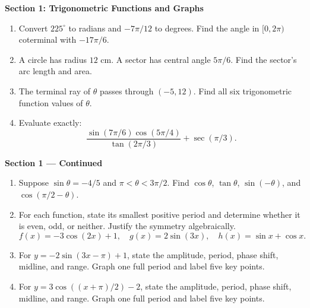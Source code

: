 \documentclass[11pt]{article}
\begin{document}
\newpage
\begin{center}{\large\textbf{Section 1: Trigonometric Functions and Graphs}}\end{center}
\begin{enumerate}[leftmargin=*,itemsep=0pt,series=chapterSix]
  \item Convert $225^\circ$ to radians and $-7\pi/12$ to degrees.
  Find the angle in $[0,2\pi)$ coterminal with $-17\pi/6$.
  \par{}

  \item A circle has radius $12$ cm. A sector has central angle $5\pi/6$.
  Find the sector's arc length and area.
  \par{}

  \item The terminal ray of $\theta$ passes through $(-5,12)$.
  Find all six trigonometric function values of $\theta$.
  \par{}

  \item Evaluate exactly:
  \[
    \frac{\sin(7\pi/6)\cos(5\pi/4)}{\tan(2\pi/3)}+\sec(\pi/3).
  \]
  \par{}
\end{enumerate}

\newpage
\begin{center}{\large\textbf{Section 1 --- Continued}}\end{center}
\begin{enumerate}[leftmargin=*,itemsep=0pt,resume=chapterSix]
  \item Suppose $\sin\theta=-4/5$ and $\pi<\theta<3\pi/2$.
  Find $\cos\theta$, $\tan\theta$, $\sin(-\theta)$, and
  $\cos(\pi/2-\theta)$.
  \par{}

  \item For each function, state its smallest positive period and determine
  whether it is even, odd, or neither. Justify the symmetry algebraically.
  \[
    f(x)=-3\cos(2x)+1,\quad g(x)=2\sin(3x),\quad h(x)=\sin x+\cos x.
  \]
  \par{}

  \item For $y=-2\sin(3x-\pi)+1$, state the amplitude, period, phase shift,
  midline, and range. Graph one full period and label five key points.
  \par{}

  \item For $y=3\cos((x+\pi)/2)-2$, state the amplitude, period, phase shift,
  midline, and range. Graph one full period and label five key points.
  \par{}
\end{enumerate}
\end{document}
